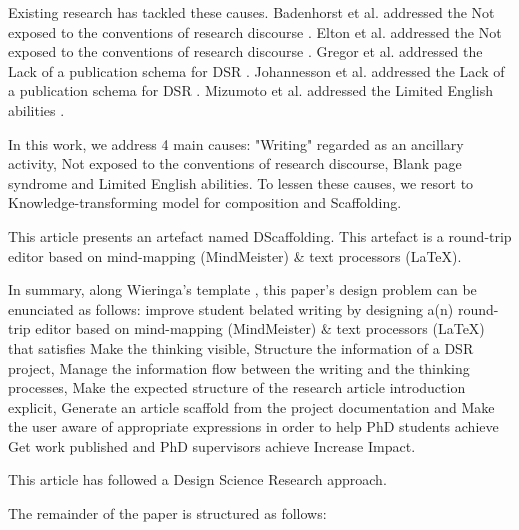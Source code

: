 \documentclass{article}
\begin{document}
Existing research has tackled these causes. Badenhorst et al. addressed the Not exposed to the conventions of research discourse \cite{Badenhorst2015}. Elton et al. addressed the Not exposed to the conventions of research discourse \cite{Elton2010}. Gregor et al. addressed the Lack of a publication schema for DSR \cite{Gregor2013}. Johannesson et al. addressed the Lack of a publication schema for DSR \cite{JohannessonAnIntroduction}. Mizumoto et al. addressed the Limited English abilities \cite{Mizumoto2017}. 
    
In this work, we address 4 main causes: "Writing" regarded as an ancillary activity, Not exposed to the conventions of research discourse, Blank page syndrome and Limited English abilities. To lessen these causes, we resort to Knowledge-transforming model for composition and Scaffolding. 
    
This article presents an artefact named DScaffolding. This artefact is a round-trip editor based on mind-mapping (MindMeister) & text processors (LaTeX). 
    
In summary, along Wieringa's template \cite{Wieringa2014}, this paper's design problem can be enunciated as follows: 
improve student belated writing
by designing a(n) round-trip editor based on mind-mapping (MindMeister) & text processors (LaTeX)
that satisfies Make the thinking visible, Structure the information of a DSR project, Manage the information flow between the writing and the thinking processes, Make the expected structure of the research article introduction explicit, Generate an article scaffold from the project documentation and Make the user aware of appropriate expressions
in order to help PhD students achieve Get work published and PhD supervisors achieve Increase Impact. 
    

      
This article has followed a Design Science Research approach.

The remainder of the paper is structured as follows: 

    
      


\end{document}
